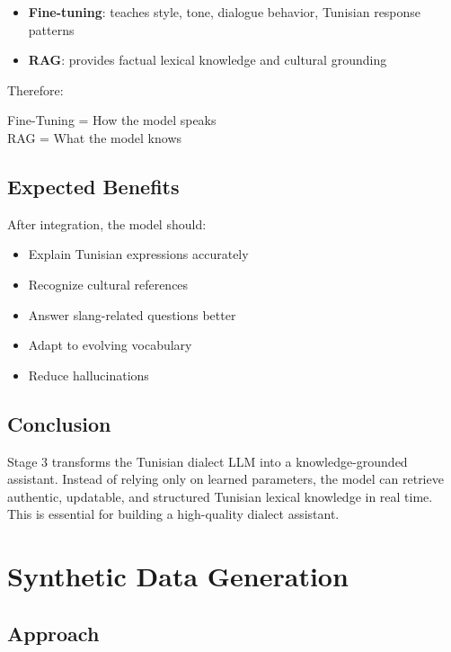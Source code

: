 \documentclass[12pt,a4paper]{report}
\begin{document}
\begin{itemize}
    \item \textbf{Fine-tuning}: teaches style, tone, dialogue behavior, Tunisian response patterns
    \item \textbf{RAG}: provides factual lexical knowledge and cultural grounding
\end{itemize}

Therefore:

\begin{center}
Fine-Tuning = How the model speaks \\
RAG = What the model knows
\end{center}

\subsection{Expected Benefits}

After integration, the model should:

\begin{itemize}
    \item Explain Tunisian expressions accurately
    \item Recognize cultural references
    \item Answer slang-related questions better
    \item Adapt to evolving vocabulary
    \item Reduce hallucinations
\end{itemize}

\subsection{Conclusion}

Stage 3 transforms the Tunisian dialect LLM into a knowledge-grounded assistant.
Instead of relying only on learned parameters, the model can retrieve authentic,
updatable, and structured Tunisian lexical knowledge in real time. This is essential
for building a high-quality dialect assistant.

\section{Synthetic Data Generation}

\subsection{Approach}
\end{document}
